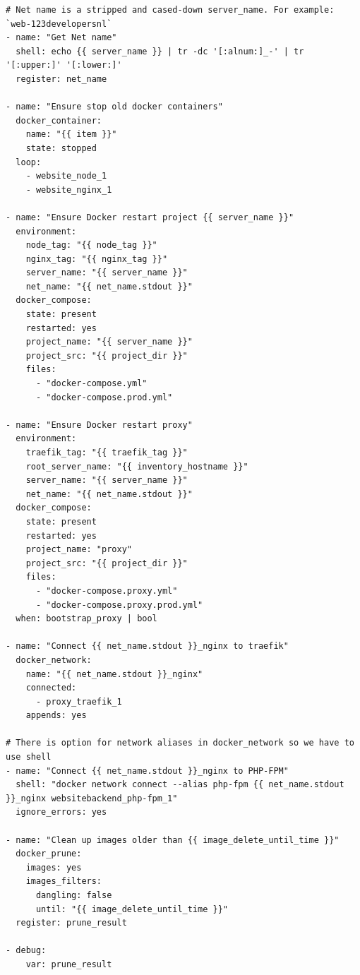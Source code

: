 \begin{verbatim}
# Net name is a stripped and cased-down server_name. For example: `web-123developersnl`
- name: "Get Net name"
  shell: echo {{ server_name }} | tr -dc '[:alnum:]_-' | tr '[:upper:]' '[:lower:]'
  register: net_name

- name: "Ensure stop old docker containers"
  docker_container:
    name: "{{ item }}"
    state: stopped
  loop:
    - website_node_1
    - website_nginx_1

- name: "Ensure Docker restart project {{ server_name }}"
  environment:
    node_tag: "{{ node_tag }}"
    nginx_tag: "{{ nginx_tag }}"
    server_name: "{{ server_name }}"
    net_name: "{{ net_name.stdout }}"
  docker_compose:
    state: present
    restarted: yes
    project_name: "{{ server_name }}"
    project_src: "{{ project_dir }}"
    files:
      - "docker-compose.yml"
      - "docker-compose.prod.yml"

- name: "Ensure Docker restart proxy"
  environment:
    traefik_tag: "{{ traefik_tag }}"
    root_server_name: "{{ inventory_hostname }}"
    server_name: "{{ server_name }}"
    net_name: "{{ net_name.stdout }}"
  docker_compose:
    state: present
    restarted: yes
    project_name: "proxy"
    project_src: "{{ project_dir }}"
    files:
      - "docker-compose.proxy.yml"
      - "docker-compose.proxy.prod.yml"
  when: bootstrap_proxy | bool

- name: "Connect {{ net_name.stdout }}_nginx to traefik"
  docker_network:
    name: "{{ net_name.stdout }}_nginx"
    connected:
      - proxy_traefik_1
    appends: yes

# There is option for network aliases in docker_network so we have to use shell
- name: "Connect {{ net_name.stdout }}_nginx to PHP-FPM"
  shell: "docker network connect --alias php-fpm {{ net_name.stdout }}_nginx websitebackend_php-fpm_1"
  ignore_errors: yes

- name: "Clean up images older than {{ image_delete_until_time }}"
  docker_prune:
    images: yes
    images_filters:
      dangling: false
      until: "{{ image_delete_until_time }}"
  register: prune_result

- debug:
    var: prune_result
\end{verbatim}

